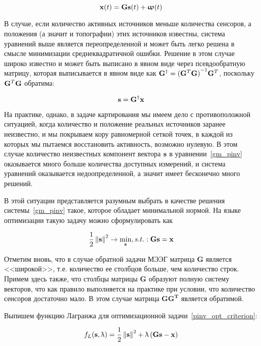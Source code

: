 \begin{equation}
    \mathbf{x}(t) = \mathbf{G} \mathbf{s}(t) + \boldsymbol{\upomega}(t)
    \label{gm_pinv}
\end{equation}

В случае, если количество активных источников меньше количества сенсоров,
а положения (а значит и топографии) этих источников известны, система
уравнений выше является переопределенной и может быть легко решена в смысле
минимизации среднеквадратичной ошибки.
Решение в этом случае широко известно и может быть выписано в явном виде
через псевдообратную матрицу, которая выписывается в явном виде как
$\mathbf{G}^\dagger = {(\mathbf{G}^T\mathbf{G})}^{-1}\mathbf{G}^T$, поскольку $\mathbf{G}^T\mathbf{G}$ обратима:

\begin{equation*}
    \mathbf{s} = \mathbf{G}^\dagger\mathbf{x}
\end{equation*}

На практике, однако, в задаче картирования мы имеем дело с противоположной ситуацией,
когда количество и положение реальных источников заранее неизвестно, и мы
покрываем кору равномерной сеткой точек, в каждой из которых мы пытаемся восстановить активность,
возможно нулевую. В этом случае количество неизвестных компонент вектора $\mathbf{s}$ в уравнении~\ref{gm_pinv}
оказывается много больше количества доступных измерений,
и система уравнений оказывается недоопределенной, а значит имеет бесконечно много решений.

В этой ситуации представляется разумным выбрать в качестве решения системы~\ref{gm_pinv}
такое, которое обладает минимальной нормой.
На языке оптимизации такую задачу можно сформулировать как

\begin{equation}
    \frac{1}{2}\left\lVert\mathbf{s}\right\rVert^2 \rightarrow \underset{\mathbf{s}}{\min},
    s.t.: \mathbf{G} \mathbf{s} = \mathbf{x}
    \label{pinv_opt_criterion}
\end{equation}

Отметим вновь, что в случае обратной задачи МЭЭГ матрица $\mathbf{G}$ является
<<широкой>>, т.е.  количество ее столбцов больше, чем количество строк. Примем
здесь также, что столбцы матрицы $\mathbf{G}$ образуют полную систему векторов,
что как правило выполняется на практике при условии, что количество сенсоров
достаточно мало. В этом случае матрица $\mathbf{GG^T}$ является обратимой.

Выпишем функцию Лагранжа для оптимизационной задачи~\ref{pinv_opt_criterion}:

\begin{equation}
    f_L(\mathbf{s}, \uplambda) = \frac{1}{2}\left\lVert\mathbf{s}\right\rVert^2 + \uplambda \left(\mathbf{Gs - x}\right)
\end{equation}

